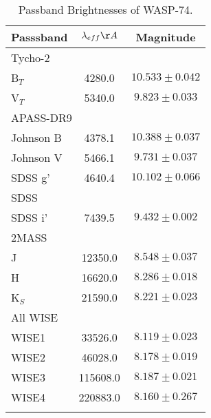 \documentclass[a4paper,fleqn,usenatbib]{mnras}
\begin{document}
\begin{table}
\centering
\caption{Passband Brightnesses of WASP-74.}
\begin{tabular}{lcc}  
\hline
\hline
Passsband & $\lambda_{eff} \AA$ & Magnitude \\
\hline
\multicolumn{3}{l}{Tycho-2 \citep{2000AA...355L..27H}}\\
\hline
B$_T$ & 4280.0 & $10.533\pm0.042$ \\
V$_T$ & 5340.0 & $9.823\pm0.033$ \\
\hline
\multicolumn{3}{l}{APASS-DR9 \citep{2015AAS...22533616H}}\\
\hline
Johnson B & 4378.1 & $10.388\pm0.037$ \\
Johnson V & 5466.1 & $9.731\pm0.037$ \\
SDSS g' & 4640.4 & $10.102\pm0.066$ \\
\hline
\multicolumn{3}{l}{SDSS \citep{2015ApJS..219...12A}}\\
\hline
SDSS i' & 7439.5 & $9.432\pm0.002$ \\
\hline
\multicolumn{3}{l}{2MASS \citep{2003yCat.2246....0C}}\\
\hline
J & 12350.0 & $8.548\pm0.037$ \\
H & 16620.0 & $8.286\pm0.018$ \\
K$_S$ & 21590.0 & $8.221\pm0.023$ \\
\hline
\multicolumn{3}{l}{All WISE \citep{2012yCat.2311....0C}}\\
\hline
WISE1 & 33526.0 & $8.119\pm0.023$ \\
WISE2 & 46028.0 & $8.178\pm0.019$ \\
WISE3 & 115608.0 & $8.187\pm0.021$ \\
WISE4 & 220883.0 & $8.160\pm0.267$ \\
\hline
\label{tab:passband_brightness}
\end{tabular}
\end{table}
\end{document}
